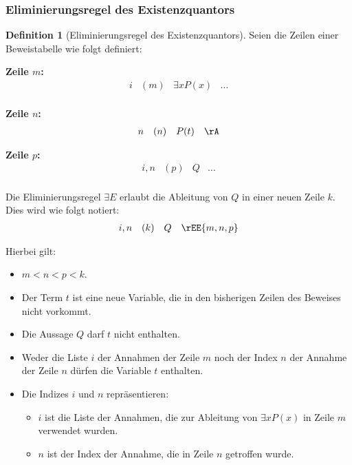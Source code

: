 \documentclass{book}
\theoremstyle{plain}
\theoremstyle{remark}
\theoremstyle{definition}
\newtheorem{definition}{Definition}[section]
\begin{document}
\subsubsection{Eliminierungsregel des Existenzquantors}
\label{rule:EE}
\begin{definition}[Eliminierungsregel des Existenzquantors]
Seien die Zeilen einer Beweistabelle wie folgt definiert:

\textbf{Zeile \(m\):}
\[
\begin{array}{llll}
    i & (m) & \exists x P(x) & \dots \\
\end{array}
\]

\textbf{Zeile \(n\):}
\[
\begin{array}{llll}
    n & (n) & P(t) & \rA \\
\end{array}
\]

\textbf{Zeile \(p\):}
\[
\begin{array}{llll}
    i,n & (p) & Q & \dots \\
\end{array}
\]

Die Eliminierungsregel \(\exists E\) erlaubt die Ableitung von \(Q\) in einer neuen Zeile \(k\). Dies wird wie folgt notiert:
\[
\begin{array}{llll}
    i,n & (k) & Q & \rEE{m,n,p} \\
\end{array}
\]

Hierbei gilt:
\begin{itemize}
    \item \(m < n < p < k\).
    \item Der Term \(t\) ist eine neue Variable, die in den bisherigen Zeilen des Beweises nicht vorkommt.
    \item Die Aussage \(Q\) darf \(t\) nicht enthalten.
    \item Weder die Liste \(i\) der Annahmen der Zeile \(m\) noch der Index \(n\) der Annahme der Zeile \(n\) dürfen die Variable \(t\) enthalten.
    \item Die Indizes \(i\) und \(n\) repräsentieren:
    \begin{itemize}
        \item \(i\) ist die Liste der Annahmen, die zur Ableitung von \(\exists x P(x)\) in Zeile \(m\) verwendet wurden.
        \item \(n\) ist der Index der Annahme, die in Zeile \(n\) getroffen wurde.
    \end{itemize}
\end{itemize}
\end{definition}
\end{document}
